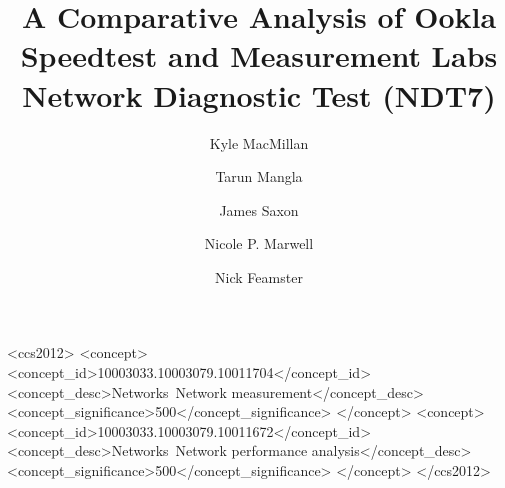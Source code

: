 \documentclass[sigconf]{acmart}
\begin{document}

\title{A Comparative Analysis of Ookla Speedtest and Measurement Labs Network
Diagnostic Test (NDT7)}


\author{Kyle MacMillan}

\author{Tarun Mangla}

\author{James Saxon}

\author{Nicole P. Marwell}

\author{Nick Feamster}

\renewcommand{\shortauthors}{Kyle MacMillan et al.}



\begin{CCSXML}
<ccs2012>
   <concept>
	   <concept_id>10003033.10003079.10011704</concept_id>
	   <concept_desc>Networks~Network measurement</concept_desc>
	   <concept_significance>500</concept_significance>
	   </concept>
   <concept>
	   <concept_id>10003033.10003079.10011672</concept_id>
	   <concept_desc>Networks~Network performance analysis</concept_desc>
	   <concept_significance>500</concept_significance>
	   </concept>
 </ccs2012>
\end{CCSXML}
\end{document}
